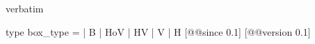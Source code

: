 \begin{camlexample}{verbatim}
\begin{caml}
\begin{camlinput}
type box_type = | B | HoV | HV | V | H [@@since 0.1] [@@version 0.1]
\end{camlinput}
\end{caml}
\end{camlexample}
